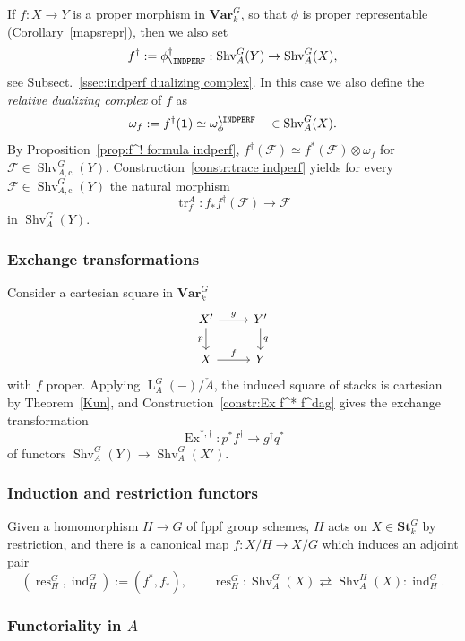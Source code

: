 \documentclass[12pt, oneside]{amsart}
\numberwithin{equation}{section}
\theoremstyle{remark}
\theoremstyle{plain}
\newcommand{\Loop}{\operatorname{L}}
\newcommand{\Stk}{\mathbf{St}_{k}}
\newcommand{\Var}{\mathbf{Var}_{k}}
\newcommand{\Shv}{\operatorname{Shv}}
\newcommand{\un}{\mathbf{1}}
\newcommand{\cF}{\mathcal{F}}
\begin{document}
If $f : X \to Y$ is a proper morphism in $\Var^G$, so that $\phi$ is proper representable (Corollary~\ref{mapsrepr}), then we also set
\[
  f^{\dag} := \phi^\dag_{\INDPERF} : \Shv_A^G(Y) \to \Shv_A^G(X),
\]
see Subsect.~\ref{ssec:indperf dualizing complex}.
In this case we also define the \emph{relative dualizing complex} of $f$ as
\[
  \omega_f := f^\dag(\un) \simeq \omega_{\phi}^{\INDPERF} \quad \in \Shv_A^G(X).
\]
By Proposition~\ref{prop:f^! formula indperf}, $f^{\dag}(\cF) \simeq f^*(\cF) \otimes \omega_f$ for $\cF \in \Shv_{A,\mathrm{c}}^G(Y)$.
Construction~\ref{constr:trace indperf} yields for every $\cF \in \Shv_{A,\mathrm{c}}^G(Y)$ the natural morphism
\begin{equation}\label{eq:trace maps}
  \operatorname{tr}^A_f : f_* f^\dag (\cF) \longrightarrow \cF
\end{equation}
in $\Shv_A^G(Y)$.

\subsubsection{Exchange transformations}\label{sssec:exchange}

Consider a cartesian square in $\Var^G$
\[\begin{tikzcd}
  X' \ar{r}{g}\ar[swap]{d}{p} & Y' \ar{d}{q} \\
  X \ar{r}{f} & Y
\end{tikzcd}\]
with $f$ proper.
Applying $\Loop_A^G(-)/\check{A}$, the induced square of stacks is cartesian by Theorem~\ref{Kun}, and Construction~\ref{constr:Ex f^* f^dag} gives the exchange transformation
\[
\operatorname{Ex}^{*,\dag} : p^* f^\dag \to g^\dag q^*
\]
of functors $\Shv_A^G(Y) \to \Shv_A^G(X')$.

\subsubsection{Induction and restriction functors}\label{sssec:res ind}

Given a homomorphism $H \to G$ of fppf group schemes, $H$ acts on $X \in \Stk^G$ by restriction, and there is a canonical map $f : X/H \to X/G$ which induces an adjoint pair
\[
  (\operatorname{res}^G_H, \operatorname{ind}^G_H) := (f^*, f_*), \qquad
  \operatorname{res}^G_H : \Shv_A^G(X) \rightleftarrows \Shv_A^H(X) : \operatorname{ind}^G_H.
\]

\subsubsection{Functoriality in $A$}\label{sssec:Shv func A}
\end{document}
